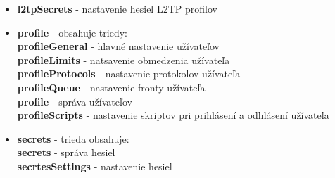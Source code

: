 \begin{itemize}
\item \textbf{l2tpSecrets} - nastavenie hesiel L2TP profilov
\item \textbf{profile} - obsahuje triedy:\\
\textbf{profileGeneral} - hlavné nastavenie užívateľov\\
\textbf{profileLimits} - natsavenie obmedzenia užívateľa\\
\textbf{profileProtocols} - nastavenie protokolov užívateľa\\
\textbf{profileQueue} - nastavenie fronty užívateľa\\
\textbf{profile} - správa užívateľov\\
\textbf{profileScripts} - nastavenie skriptov pri prihlásení a odhlásení užívateľa
\item \textbf{secrets} - trieda obsahuje:\\
\textbf{secrets} - správa hesiel\\
\textbf{secrtesSettings} - nastavenie hesiel
\end{itemize}
